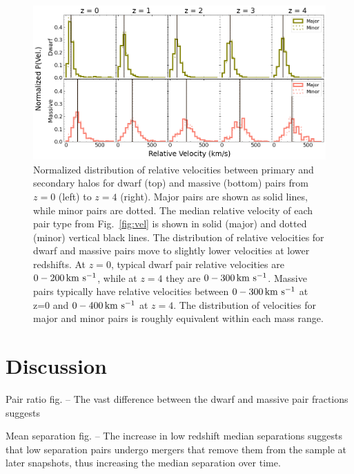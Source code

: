 \documentclass[twocolumn]{aastex631}
\begin{document}
\begin{figure}[htp]
  \centering
  \includegraphics[width=\textwidth]{velocity_distribution_1000.png}
  \caption{
  Normalized distribution of relative velocities between primary and secondary halos for dwarf (top) and massive (bottom) pairs from $z=0$ (left) to $z=4$ (right). Major pairs are shown as solid lines, while minor pairs are dotted. The median relative velocity of each pair type from Fig.~\ref{fig:vel} is shown in solid (major) and dotted (minor) vertical black lines. 
  The distribution of relative velocities for dwarf and massive pairs move to slightly lower velocities at lower redshifts. 
  At $z=0$, typical dwarf pair relative velocities are $0-200\,\mathrm{km}~\mathrm{s}^{-1}$, while at $z=4$ they are $0-300\,\mathrm{km}~\mathrm{s}^{-1}$. 
  Massive pairs typically have relative velocities between $0-300\,\mathrm{km}~\mathrm{s}^{-1}$ at z=0 and $0-400\,\mathrm{km}~\mathrm{s}^{-1}$ at $z=4$.
  The distribution of velocities for major and minor pairs is roughly equivalent within each mass range. 
    }
  \label{fig:vel-dist}
\end{figure}




\section{Discussion}
\label{sec:discussion}

Pair ratio fig. -- The vast difference between the dwarf and massive pair fractions suggests  

Mean separation fig. -- The increase in low redshift median separations suggests that low separation pairs undergo mergers that remove them from the sample at later snapshots, thus increasing the median separation over time.
\end{document}
